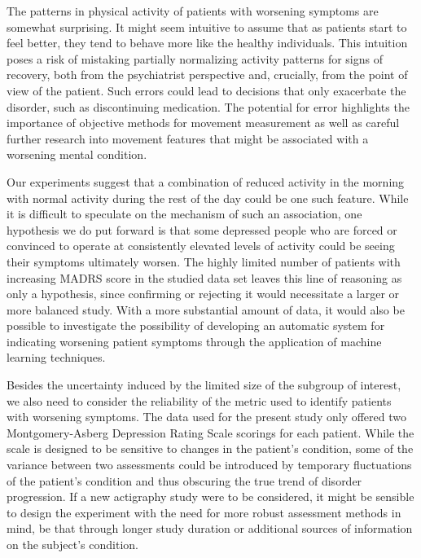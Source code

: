 \documentclass[12pt]{article}
\begin{document}

The patterns in physical activity of patients with worsening symptoms are somewhat surprising. It might seem intuitive to assume that as patients start to feel better, they tend to behave more like the healthy individuals. This intuition poses a risk of mistaking partially normalizing activity patterns for signs of recovery, both from the psychiatrist perspective and, crucially, from the point of view of the patient. Such errors could lead to decisions that only exacerbate the disorder, such as discontinuing medication. The potential for error highlights the importance of objective methods for movement measurement as well as careful further research into movement features that might be associated with a worsening mental condition.

Our experiments suggest that a combination of reduced activity in the morning with normal activity during the rest of the day could be one such feature. While it is difficult to speculate on the mechanism of such an association, one hypothesis we do put forward is that some depressed people who are forced or convinced to operate at consistently elevated levels of activity could be seeing their symptoms ultimately worsen. The highly limited number of patients with increasing MADRS score in the studied data set leaves this line of reasoning as only a hypothesis, since confirming or rejecting it would necessitate a larger or more balanced study. With a more substantial amount of data, it would also be possible to investigate the possibility of developing an automatic system for indicating worsening patient symptoms through the application of machine learning techniques.

Besides the uncertainty induced by the limited size of the subgroup of interest, we also need to consider the reliability of the metric used to identify patients with worsening symptoms. The data used for the present study only offered two Montgomery-Asberg Depression Rating Scale scorings for each patient. While the scale is designed to be sensitive to changes in the patient's condition, some of the variance between two assessments could be introduced by temporary fluctuations of the patient's condition and thus obscuring the true trend of disorder progression. If a new actigraphy study were to be considered, it might be sensible to design the experiment with the need for more robust assessment methods in mind, be that through longer study duration or additional sources of information on the subject's condition.



\newpage
\printbibliography
\end{document}

